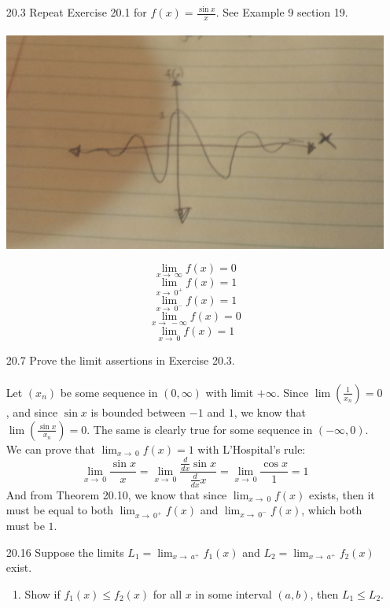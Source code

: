 
\usepackage{amsmath, amssymb, dsfont}
\usepackage{graphicx}

\oddsidemargin 0in
\evensidemargin 0in
\textwidth 6.5in
\topmargin -0.5in
\textheight 9.0in
\newcommand{\norm}[1]{\left\lVert #1 \right\rVert}
\newcommand{\abs}[1]{\left\vert #1 \right\vert}
\newcommand{\?}{\stackrel{?}{=}}



\pagestyle{myheadings}

\begin{enumerate}
  \item [20.3]
    Repeat Exercise 20.1 for $f(x) = \frac{\sin x}{x}$. See Example 9 section 19.\\\\

    \includegraphics[width=1\textwidth]{img}

    $$\lim_{x \to\ \infty} f(x) = 0$$
    $$\lim_{x \to\ 0^{+}} f(x) = 1$$
    $$\lim_{x \to\ 0^{-}} f(x) = 1$$
    $$\lim_{x \to\ - \infty} f(x) = 0$$
    $$\lim_{x \to\ 0} f(x) = 1$$
  \item [20.7]
    Prove the limit assertions in Exercise 20.3.\\\\
    
    Let $(x_n)$ be some sequence in $(0, \infty)$ with limit $+ \infty$. Since $\lim(\frac{1}{x_n}) = 0$, and since $\sin x$ is bounded between $-1$ and $1$, we know that $\lim(\frac{\sin x}{x_n}) = 0$. The same is clearly true for some sequence in $(-\infty, 0)$.\\

    We can prove that $\lim_{x \to\ 0} f(x) = 1$ with L'Hospital's rule:
    $$\lim_{x \to\ 0} \frac{\sin x}{x} = \lim_{x \to\ 0} \frac{\frac{d}{dx} \sin x}{\frac{d}{dx} x} = \lim_{x \to\ 0} \frac{\cos x}{1} = 1$$
    And from Theorem 20.10, we know that since $\lim_{x \to\ 0} f(x)$ exists, then it must be equal to both $\lim_{x \to\ 0^+} f(x)$ and $\lim_{x \to\ 0^-} f(x)$, which both must be $1$.
  \item [20.16]
    Suppose the limits $L_1 = \lim_{x \to\ a^+} f_1(x)$ and $L_2 = \lim_{x \to\ a^+} f_2(x)$ exist.
    \begin{enumerate}
      \item Show if $f_1(x) \leq f_2(x)$ for all $x$ in some interval $(a,b)$, then $L_1 \leq L_2$.\\\\


\end{enumerate}
\end{enumerate}
